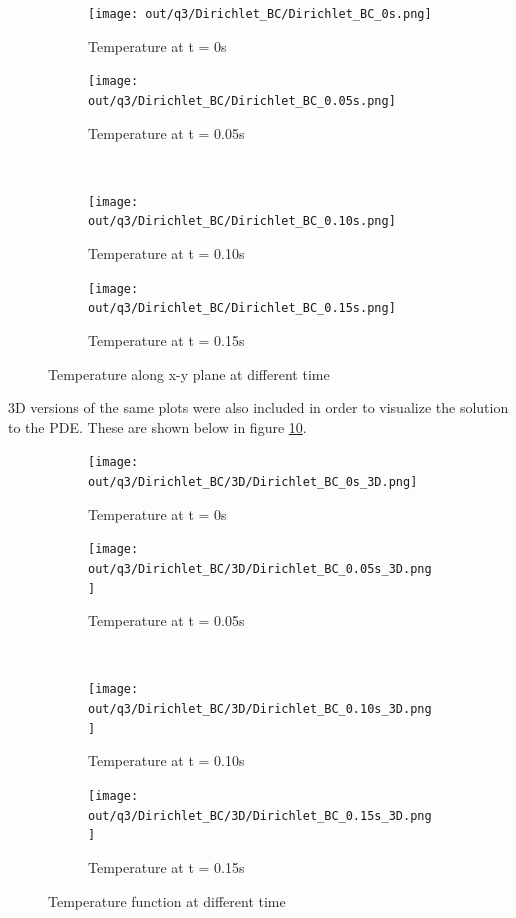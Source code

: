 \documentclass[12pt]{article}
\begin{document}
\begin{figure}[H]
    \centering
    \begin{subfigure}[]{0.48\textwidth}
        \centering
        \texttt{[image: out/q3/Dirichlet\_BC/Dirichlet\_BC\_0s.png]}
        \caption{Temperature at t = 0s}
        \label{fig:q3_Dirichlet_BC_0s_a}
    \end{subfigure}
    \begin{subfigure}[]{0.48\textwidth}
        \centering
        \texttt{[image: out/q3/Dirichlet\_BC/Dirichlet\_BC\_0.05s.png]}
        \caption{Temperature at t = 0.05s}
        \label{fig:q3_Dirichlet_BC_0.05s_a}
    \end{subfigure}
    \\
    \begin{subfigure}[]{0.48\textwidth}
        \centering
        \texttt{[image: out/q3/Dirichlet\_BC/Dirichlet\_BC\_0.10s.png]}
        \caption{Temperature at t = 0.10s}
        \label{fig:q3_Dirichlet_BC_0.10s_a}
    \end{subfigure}
    \begin{subfigure}[]{0.48\textwidth}
        \centering
        \texttt{[image: out/q3/Dirichlet\_BC/Dirichlet\_BC\_0.15s.png]}
        \caption{Temperature at t = 0.15s}
        \label{fig:q3_Dirichlet_BC_0.15s_a}
    \end{subfigure}
    \caption{Temperature along x-y plane at different time}
    \label{fig:q3_plots_a}
\end{figure}

3D versions of the same plots were also included in order to visualize the solution to the PDE. These are shown below in figure \ref{fig:q3_plots_b}.

\begin{figure}[H]
    \centering
    \begin{subfigure}[]{0.48\textwidth}
        \centering
        \texttt{[image: out/q3/Dirichlet\_BC/3D/Dirichlet\_BC\_0s\_3D.png]}
        \caption{Temperature at t = 0s}
        \label{fig:q3_Dirichlet_BC_0s_b}
    \end{subfigure}
    \begin{subfigure}[]{0.48\textwidth}
        \centering
        \texttt{[image: out/q3/Dirichlet\_BC/3D/Dirichlet\_BC\_0.05s\_3D.png]}
        \caption{Temperature at t = 0.05s}
        \label{fig:q3_Dirichlet_BC_0.05s_b}
    \end{subfigure}
    \\
    \begin{subfigure}[]{0.48\textwidth}
        \centering
        \texttt{[image: out/q3/Dirichlet\_BC/3D/Dirichlet\_BC\_0.10s\_3D.png]}
        \caption{Temperature at t = 0.10s}
        \label{fig:q3_Dirichlet_BC_0.10s_b}
    \end{subfigure}
    \begin{subfigure}[]{0.48\textwidth}
        \centering
        \texttt{[image: out/q3/Dirichlet\_BC/3D/Dirichlet\_BC\_0.15s\_3D.png]}
        \caption{Temperature at t = 0.15s}
        \label{fig:q3_Dirichlet_BC_0.15s_b}
    \end{subfigure}
    \caption{Temperature function at different time}
    \label{fig:q3_plots_b}
\end{figure}
\end{document}
